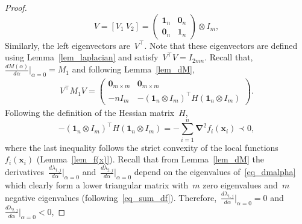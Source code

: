 \documentclass[letterpaper, 10pt, conference]{ieeeconf}
\def\mb{\mathbf}
\begin{document}
\begin{proof}
\begin{equation} \label{eq_V}
V = [V_1~ V_2] =\left(\begin{array}{cc}
	\mb{1}_n& \mb{0}_n \\
	\mb{0}_n & \mb{1}_n 
\end{array} \right)\otimes I_m,
\end{equation}
    Similarly, the left eigenvectors are~$V^\top$. Note that these eigenvectors are defined using Lemma~\ref{lem_laplacian} and satisfy~$V^\top V=I_{2mn}$. Recall that, ~$\frac{dM(\alpha)}{d\alpha}|_{\alpha=0}=M_1$ and following Lemma~\ref{lem_dM},
    	\begin{eqnarray} \label{eq_dmalpha}
    		V^\top M_1 V= \left(\begin{array}{cc}
    \mb{0}_{m\times m}	& \mb{0}_{m\times m} \\
    -nI_m	& -(\mb{1}_n \otimes I_m)^\top H (\mb{1}_n \otimes I_m)
    \end{array} \right).
    \end{eqnarray}  
    Following the definition of the Hessian matrix~$H$,
    \begin{equation} \label{eq_sum_df}
    	-(\mb{1}_n \otimes I_m)^\top H (\mb{1}_n \otimes I_m)= -\sum_{i=1}^n \boldsymbol{ \nabla}^2 f_i(\mb{x}_i) \prec 0,
    \end{equation}
    where the last inequality follows the strict convexity of the local functions~$f_i(\mb{x}_i)$ (Lemma~\ref{lem_f(x)}). 
    Recall that from Lemma~\ref{lem_dM} the derivatives~$\frac{d\lambda_{1,j}}{d\alpha}|_{\alpha=0}$ and~$\frac{d\lambda_{2,j}}{d\alpha}|_{\alpha=0}$ depend on the eigenvalues of~\eqref{eq_dmalpha} which clearly form a lower triangular matrix with~$m$ zero eigenvalues and~$m$ negative eigenvalues (following~\eqref{eq_sum_df}). Therefore,~$\frac{d\lambda_{1,j}}{d\alpha}|_{\alpha=0} = 0$ and~$\frac{d\lambda_{2,j}}{d\alpha}|_{\alpha=0}<0$, 

\end{proof}
\end{document}
